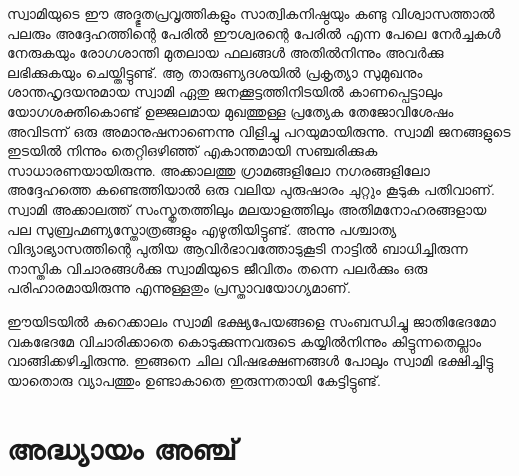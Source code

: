 \documentclass[12pt,openany]{book}
\begin{document}
	സ്വാമിയുടെ ഈ അദ്ഭുതപ്രവൃത്തികളും സാത്വികനിഷ്ഠയും കണ്ടു വിശ്വാസത്താൽ പലരും അദ്ദേഹത്തിന്റെ പേരിൽ ഈശ്വരന്റെ പേരിൽ എന്ന പേലെ നേർച്ചകൾ നേരുകയും രോഗശാന്തി മുതലായ ഫലങ്ങൾ അതിൽനിന്നും അവർക്കു ലഭിക്കുകയും ചെയ്തിട്ടുണ്ട്. ആ താരുണ്യദശയിൽ പ്രകൃത്യാ സുമുഖനും ശാന്തഹൃദയനുമായ സ്വാമി ഏതു ജനക്കൂട്ടത്തിനിടയിൽ കാണപ്പെട്ടാലും യോഗശക്തികൊണ്ട് ഉജ്ജലമായ മുഖത്തുള്ള പ്രത്യേക തേജോവിശേഷം അവിടന്ന് ഒരു അമാനുഷനാണെന്നു വിളിച്ചു പറയുമായിരുന്നു. സ്വാമി ജനങ്ങളുടെ ഇടയിൽ നിന്നും തെറ്റിഒഴിഞ്ഞ് എകാന്തമായി സഞ്ചരിക്കുക സാധാരണയായിരുന്നു. അക്കാലത്തു ഗ്രാമങ്ങളിലോ നഗരങ്ങളിലോ അദ്ദേഹത്തെ കണ്ടെത്തിയാൽ ഒരു വലിയ പുരുഷാരം ചുറ്റും കൂടുക പതിവാണ്. സ്വാമി അക്കാലത്ത് സംസ്കൃതത്തിലും മലയാളത്തിലും അതിമനോഹരങ്ങളായ പല സുബ്രഹ്മണ്യസ്തോത്രങ്ങളും എഴുതിയിട്ടുണ്ട്. അന്നു പശ്ചാത്യ വിദ്യാഭ്യാസത്തിന്റെ പുതിയ ആവിർഭാവത്തോടുകൂടി നാട്ടിൽ ബാധിച്ചിരുന്ന നാസ്തിക വിചാരങ്ങൾക്കു സ്വാമിയുടെ ജീവിതം തന്നെ പലർക്കും ഒരു പരിഹാരമായിരുന്നു എന്നുള്ളതും പ്രസ്താവയോഗ്യമാണ്.
	
	ഈയിടയിൽ കുറെക്കാലം സ്വാമി ഭക്ഷ്യപേയങ്ങളെ സംബന്ധിച്ചു ജാതിഭേദമോ വകഭേദമേ വിചാരിക്കാതെ കൊടുക്കുന്നവരുടെ കയ്യിൽനിന്നും കിട്ടുന്നതെല്ലാം വാങ്ങിക്കഴിച്ചിരുന്നു. ഇങ്ങനെ ചില വിഷഭക്ഷണങ്ങൾ പോലും സ്വാമി ഭക്ഷിച്ചിട്ടു യാതൊരു വ്യാപത്തും ഉണ്ടാകാതെ ഇരുന്നതായി കേട്ടിട്ടുണ്ട്.
	
	\newpage
	
	\chapter*{അദ്ധ്യായം അഞ്ച്}
	
\end{document}
